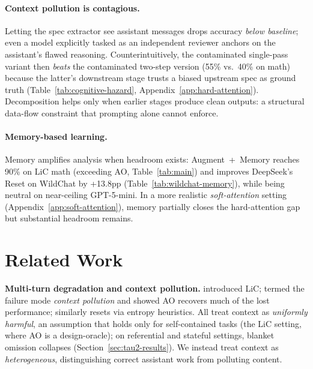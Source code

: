 \documentclass{article}
\begin{document}
\paragraph{Context pollution is contagious.}
\label{sec:analysis-ablations}
\label{sec:cognitive-hazard}
Letting the spec extractor see assistant messages drops accuracy \emph{below baseline}; even a model explicitly tasked as an independent reviewer anchors on the assistant's flawed reasoning. Counterintuitively, the contaminated single-pass variant then \emph{beats} the contaminated two-step version (55\% vs.\ 40\% on math) because the latter's downstream stage trusts a biased upstream spec as ground truth (Table~\ref{tab:cognitive-hazard}, Appendix~\ref{app:hard-attention}). Decomposition helps only when earlier stages produce clean outputs: a structural data-flow constraint that prompting alone cannot enforce.


\paragraph{Memory-based learning.}
\label{sec:memory-discussion}
Memory amplifies analysis when headroom exists: Augment~+~Memory reaches 90\% on LiC math (exceeding AO, Table~\ref{tab:main}) and improves DeepSeek's Reset on WildChat by +13.8pp (Table~\ref{tab:wildchat-memory}), while being neutral on near-ceiling GPT-5-mini. In a more realistic \emph{soft-attention} setting (Appendix~\ref{app:soft-attention}), memory partially closes the hard-attention gap but substantial headroom remains.




\section{Related Work}
\label{sec:related}

\noindent\textbf{Multi-turn degradation and context pollution.}
\citet{laban2025lost} introduced LiC; \citet{huang2026context} termed the failure mode \emph{context pollution} and showed AO recovers much of the lost performance; \citet{khalid2025ergo} similarly resets via entropy heuristics. All treat context as \emph{uniformly harmful}, an assumption that holds only for self-contained tasks (the LiC setting, where AO is a design-oracle); on referential and stateful settings, blanket omission collapses (Section~\ref{sec:tau2-results}). We instead treat context as \emph{heterogeneous}, distinguishing correct assistant work from polluting content.
\end{document}
